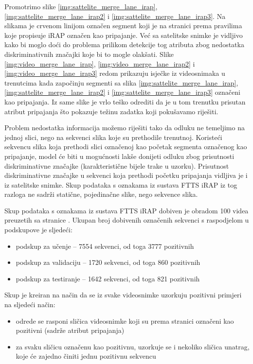 \documentclass[times, utf8, diplomski, numeric]{fer}
\begin{document}
Promotrimo slike \ref{img:sattelite_merge_lane_irap}, \ref{img:sattelite_merge_lane_irap2} i \ref{img:sattelite_merge_lane_irap3}. Na slikama je crvenom linijom označen segment koji je na stranici \citep{url:ftts_irap} prema pravilima koje propisuje iRAP označen kao pripajanje. 
Već sa satelitske snimke je vidljivo kako bi moglo doći do problema prilikom detekcije tog atributa zbog nedostatka diskriminativnih značajki koje bi to mogle olakšati.
Slike \ref{img:video_merge_lane_irap}, \ref{img:video_merge_lane_irap2} i \ref{img:video_merge_lane_irap3} redom prikazuju isječke iz videosnimaka u trenutcima kada započinju segmenti sa slika \ref{img:sattelite_merge_lane_irap}, \ref{img:sattelite_merge_lane_irap2} i \ref{img:sattelite_merge_lane_irap3} označeni kao pripajanja. 
Iz same slike je vrlo teško odrediti da je u tom trenutku prisutan atribut pripajanja što pokazuje težinu zadatka koji pokušavamo riješiti.

Problem nedostatka informacija možemo riješiti tako da odluku ne temeljimo na jednoj slici, nego na sekvenci slika koje su prethodile trenutnoj. 
Koristeći sekvencu slika koja prethodi slici označenoj kao početak segmenta označenog kao pripajanje, model će biti u mogućnosti lakše donijeti odluku zbog prisutnosti diskriminativne značajke (karakteristične bijele trake u uzorku).
Prisutnost diskriminativne značajke u sekvenci koja prethodi početku pripajanja vidljiva je i iz satelitske snimke.
Skup podataka s oznakama iz sustava FTTS iRAP iz tog razloga ne sadrži statične, pojedinačne slike, nego sekvence slika.

Skup podataka s oznakama iz sustava FTTS iRAP dobiven je obradom 100 videa preuzetih sa stranice \citep{url:ftts_irap}. 
Ukupan broj dobivenih označenih sekvenci s raspodjelom u podskupove je sljedeći:
\begin{itemize}
 \item podskup za učenje -- 7554 sekvenci, od toga 3777 pozitivnih
 \item podskup za validaciju -- 1720 sekvenci, od toga 860 pozitivnih
 \item podskup za testiranje -- 1642 sekvenci, od toga 821 pozitivnih
\end{itemize}

\noindent Skup je kreiran na način da se iz svake videosnimke uzorkuju pozitivni primjeri na sljedeći način: 
\begin{itemize}
 \item odrede se rasponi sličica videosnimke koji su prema stranici \citep{url:ftts_irap} označeni kao pozitivni (sadrže atribut pripajanja)
 \item za svaku sličicu označenu kao pozitivnu, uzorkuje se i nekoliko sličica unatrag, koje će zajedno činiti jednu pozitivnu sekvencu
\end{itemize}
\end{document}
